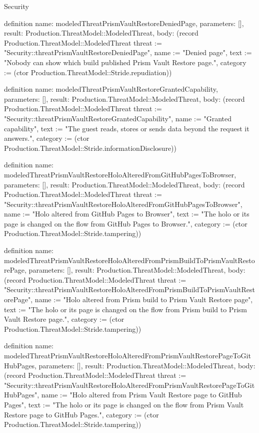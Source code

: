 \begin{lexlean}{Security}
\begin{semanticmodule}
definition{
  name: modeledThreatPrismVaultRestoreDeniedPage,
  parameters: [],
  result: Production.ThreatModel::ModeledThreat,
  body: (record Production.ThreatModel::ModeledThreat {threat := "Security::threatPrismVaultRestoreDeniedPage", name := "Denied page", text := "Nobody can show which build published Prism Vault Restore page.", category := (ctor Production.ThreatModel::Stride.repudiation)})
}

definition{
  name: modeledThreatPrismVaultRestoreGrantedCapability,
  parameters: [],
  result: Production.ThreatModel::ModeledThreat,
  body: (record Production.ThreatModel::ModeledThreat {threat := "Security::threatPrismVaultRestoreGrantedCapability", name := "Granted capability", text := "The guest reads, stores or sends data beyond the request it answers.", category := (ctor Production.ThreatModel::Stride.informationDisclosure)})
}

definition{
  name: modeledThreatPrismVaultRestoreHoloAlteredFromGitHubPagesToBrowser,
  parameters: [],
  result: Production.ThreatModel::ModeledThreat,
  body: (record Production.ThreatModel::ModeledThreat {threat := "Security::threatPrismVaultRestoreHoloAlteredFromGitHubPagesToBrowser", name := "Holo altered from GitHub Pages to Browser", text := "The holo or its page is changed on the flow from GitHub Pages to Browser.", category := (ctor Production.ThreatModel::Stride.tampering)})
}

definition{
  name: modeledThreatPrismVaultRestoreHoloAlteredFromPrismBuildToPrismVaultRestorePage,
  parameters: [],
  result: Production.ThreatModel::ModeledThreat,
  body: (record Production.ThreatModel::ModeledThreat {threat := "Security::threatPrismVaultRestoreHoloAlteredFromPrismBuildToPrismVaultRestorePage", name := "Holo altered from Prism build to Prism Vault Restore page", text := "The holo or its page is changed on the flow from Prism build to Prism Vault Restore page.", category := (ctor Production.ThreatModel::Stride.tampering)})
}

definition{
  name: modeledThreatPrismVaultRestoreHoloAlteredFromPrismVaultRestorePageToGitHubPages,
  parameters: [],
  result: Production.ThreatModel::ModeledThreat,
  body: (record Production.ThreatModel::ModeledThreat {threat := "Security::threatPrismVaultRestoreHoloAlteredFromPrismVaultRestorePageToGitHubPages", name := "Holo altered from Prism Vault Restore page to GitHub Pages", text := "The holo or its page is changed on the flow from Prism Vault Restore page to GitHub Pages.", category := (ctor Production.ThreatModel::Stride.tampering)})
}


\end{semanticmodule}
\end{lexlean}
